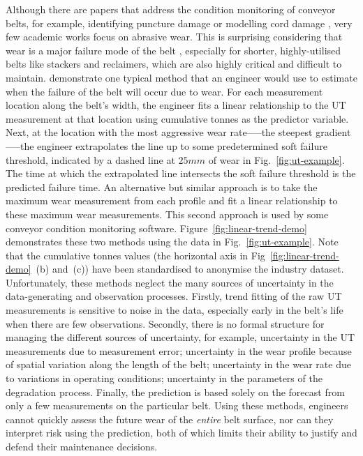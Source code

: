 Although there are papers that address the condition monitoring of conveyor belts, for example, identifying puncture damage or modelling cord damage \citep{bortnowski_2022}, very few academic works focus on abrasive wear. This is surprising considering that wear is a major failure mode of the belt \citep{bortnowski_2022}, especially for shorter, highly-utilised belts like stackers and reclaimers, which are also highly critical and difficult to maintain. \citet{webb_2020} demonstrate one typical method that an engineer would use to estimate when the failure of the belt will occur due to wear. For each measurement location along the belt's width, the engineer fits a linear relationship to the UT measurement at that location using cumulative tonnes as the predictor variable. Next, at the location with the most aggressive wear rate—--the steepest gradient—--the engineer extrapolates the line up to some predetermined soft failure threshold, indicated by a dashed line at $25mm$ of wear in Fig.~\ref{fig:ut-example}. The time at which the extrapolated line intersects the soft failure threshold is the predicted failure time. An alternative but similar approach is to take the maximum wear measurement from each profile and fit a linear relationship to these maximum wear measurements. This second approach is used by some conveyor condition monitoring software. Figure~\ref{fig:linear-trend-demo} demonstrates these two methods using the data in Fig.~\ref{fig:ut-example}. Note that the cumulative tonnes values (the horizontal axis in Fig~\ref{fig:linear-trend-demo}~(b) and~(c)) have been standardised to anonymise the industry dataset. Unfortunately, these methods neglect the many sources of uncertainty in the data-generating and observation processes. Firstly, trend fitting of the raw UT measurements is sensitive to noise in the data, especially early in the belt's life when there are few observations. Secondly, there is no formal structure for managing the different sources of uncertainty, for example, uncertainty in the UT measurements due to measurement error; uncertainty in the wear profile because of spatial variation along the length of the belt; uncertainty in the wear rate due to variations in operating conditions; uncertainty in the parameters of the degradation process. Finally, the prediction is based solely on the forecast from only a few measurements on the particular belt. Using these methods, engineers cannot quickly assess the future wear of the \emph{entire} belt surface, nor can they interpret risk using the prediction, both of which limits their ability to justify and defend their maintenance decisions.


